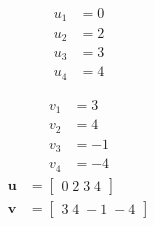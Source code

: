 \[\begin{aligned}
u_{1} &= 0 \\
u_{2} &= 2 \\
u_{3} &= 3 \\
u_{4} &= 4 
\end{aligned}\]

\[\begin{aligned}
v_{1} &= 3 \\
v_{2} &= 4 \\
v_{3} &= -1 \\
v_{4} &= -4 
\end{aligned}\]
\[\begin{aligned}
\mathbf{u} &= \begin{bmatrix}0\;2\;3\;4\end{bmatrix} \\
\mathbf{v} &= \begin{bmatrix}3\;4\;-1\;-4\end{bmatrix}
\end{aligned}\]

